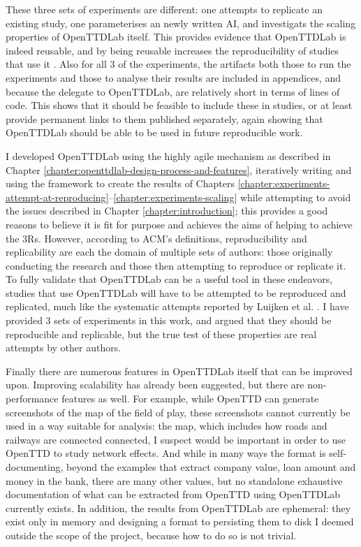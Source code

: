 \documentclass[logo,msc,dsti]{style/infthesis}    %
\begin{document}
{These three sets of experiments are different: one attempts to replicate an existing study, one parameterises an newly written AI, and investigats the scaling properties of OpenTTDLab itself. This provides evidence that OpenTTDLab is indeed reusable, and by being reusable increases the reproducibility of studies that use it \cite{benureau2018re}. Also for all 3 of the experiments, the artifacts both those to run the experiments and those to analyse their results are included in appendices, and because the delegate to OpenTTDLab, are relatively short in terms of lines of code. This shows that it should be feasible to include these in studies, or at least provide permanent links to them published separately, again showing that OpenTTDLab should be able to be used in future reproducible work.

I developed OpenTTDLab using the highly agile mechanism as described in Chapter \ref{chapter:openttdlab-design-process-and-features}, iteratively writing and using the framework to create the results of Chapters \ref{chapter:experiments-attempt-at-reproducing}--\ref{chapter:experiments-scaling} while attempting to avoid the issues described in Chapter \ref{chapter:introduction}; this provides a good reasons to believe it is fit for purpose and achieves the aims of helping to achieve the 3Rs. However, according to ACM's definitions, reproducibility and replicability are each the domain of multiple sets of authors: those originally conducting the research and those then attempting to reproduce or replicate it. To fully validate that OpenTTDLab can be a useful tool in these endeavors, studies that use OpenTTDLab will have to be attempted to be reproduced and replicated, much like the systematic attempts reported by Luijken et al. \cite{luijken2024replicability}. I have provided 3 sets of experiments in this work, and argued that they should be reproducible and replicable, but the true test of these properties are real attempts by other authors.

Finally there are numerous features in OpenTTDLab itself that can be improved upon. Improving scalability has already been suggested, but there are non-performance features as well. For example, while OpenTTD can generate screenshots of the map of the field of play, these screenshots cannot currently be used in a way suitable for analysis: the map, which includes how roads and railways are connected connected, I suspect would be important in order to use OpenTTD to study network effects. And while in many ways the format is  self-documenting, beyond the examples that extract company value, loan amount and money in the bank, there are many other values, but no standalone exhaustive documentation of what can be extracted from OpenTTD using OpenTTDLab currently exists. In addition, the results from OpenTTDLab are ephemeral: they exist only in memory and designing a format to persisting them to disk I deemed outside the scope of the project, because how to do so is not trivial.

}
\end{document}
